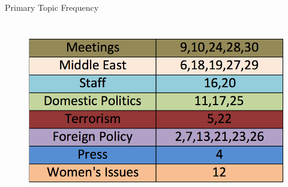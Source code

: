 \documentclass[handout,13pt]{beamer}
\begin{document}
\begin{frame}{Primary Topic Frequency}
\begin{columns}

  \begin{figure}[h]
  \centering
  \includegraphics[width=0.8\linewidth]{../images/topic_desc.png}
  \label{fig:topics_desc}
  \end{figure}


\end{columns}
\end{frame}
\end{document}
